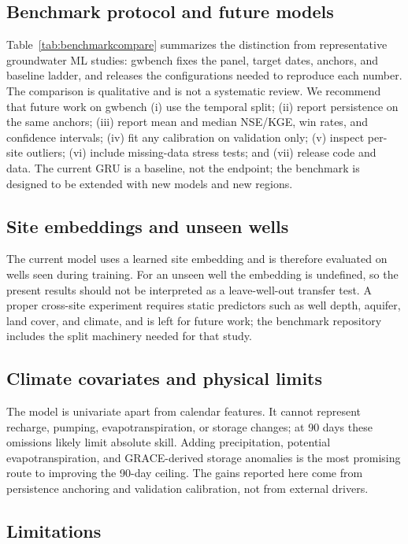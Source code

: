 \documentclass[preprint,12pt]{elsarticle}
\begin{document}
\subsection{Benchmark protocol and future models}

Table~\ref{tab:benchmarkcompare} summarizes the distinction from representative
groundwater ML studies: gwbench fixes the panel, target dates, anchors, and
baseline ladder, and releases the configurations needed to reproduce each
number. The comparison is qualitative and is not a systematic review.
We recommend that future work on gwbench (i) use the temporal split; (ii)
report persistence on the same anchors; (iii) report mean and median NSE/KGE,
win rates, and confidence intervals; (iv) fit any calibration on validation
only; (v) inspect per-site outliers; (vi) include missing-data stress tests;
and (vii) release code and data. The current GRU is a baseline, not the
endpoint; the benchmark is designed to be extended with new models and new
regions.

\subsection{Site embeddings and unseen wells}

The current model uses a learned site embedding and is therefore evaluated on
wells seen during training. For an unseen well the embedding is undefined, so
the present results should not be interpreted as a leave-well-out transfer
test. A proper cross-site experiment requires static predictors such as well
depth, aquifer, land cover, and climate, and is left for future work; the
benchmark repository includes the split machinery needed for that study.

\subsection{Climate covariates and physical limits}

The model is univariate apart from calendar features. It cannot represent
recharge, pumping, evapotranspiration, or storage changes; at 90 days these
omissions likely limit absolute skill. Adding precipitation, potential
evapotranspiration, and GRACE-derived storage anomalies is the most promising
route to improving the 90-day ceiling. The gains reported here come from
persistence anchoring and validation calibration, not from external drivers.

\subsection{Limitations}
\label{sec:limitations}
\end{document}
